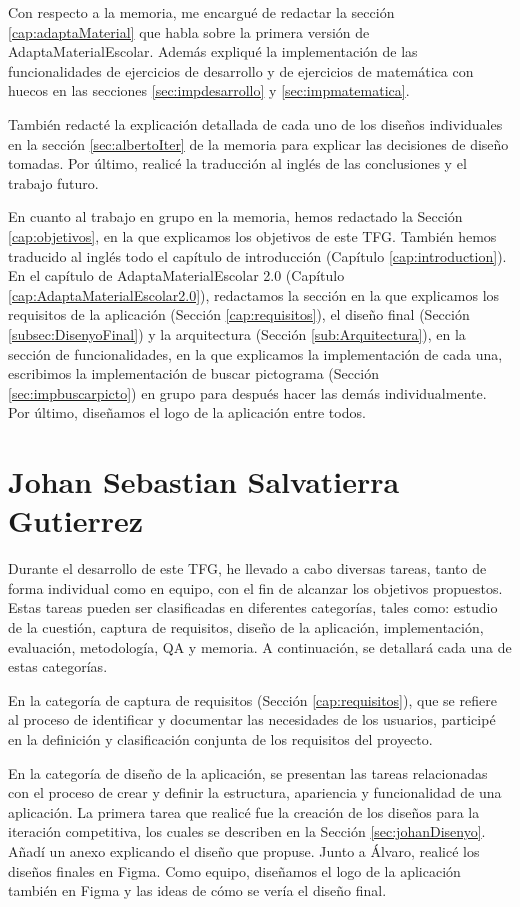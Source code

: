 Con respecto a la memoria, me encargué de redactar la sección \ref{cap:adaptaMaterial} que habla sobre la primera versión de AdaptaMaterialEscolar. Además expliqué la implementación de las funcionalidades de ejercicios de desarrollo y de ejercicios de matemática con huecos en las secciones \ref{sec:impdesarrollo} y \ref{sec:impmatematica}.

También redacté la explicación detallada de cada uno de los diseños individuales en la sección \ref{sec:albertoIter} de la memoria para explicar las decisiones de diseño tomadas. Por último, realicé la traducción al inglés de las conclusiones y el trabajo futuro.

En cuanto al trabajo en grupo en la memoria, hemos redactado la Sección \ref{cap:objetivos}, en la que explicamos los objetivos de este TFG. También hemos traducido al inglés todo el capítulo de introducción (Capítulo \ref{cap:introduction}). En el capítulo de AdaptaMaterialEscolar 2.0 (Capítulo \ref{cap:AdaptaMaterialEscolar2.0}), redactamos la sección en la que explicamos los requisitos de la aplicación (Sección \ref{cap:requisitos}), el diseño final (Sección \ref{subsec:DisenyoFinal}) y la arquitectura (Sección \ref{sub:Arquitectura}), en la sección de funcionalidades, en la que explicamos la implementación de cada una, escribimos la implementación de buscar pictograma (Sección \ref{sec:impbuscarpicto}) en grupo para después hacer las demás individualmente. Por último, diseñamos el logo de la aplicación entre todos.


\section{Johan Sebastian Salvatierra Gutierrez}
Durante el desarrollo de este TFG, he llevado a cabo diversas tareas, tanto de forma individual como en equipo, con el fin de alcanzar los objetivos propuestos. Estas tareas pueden ser clasificadas en diferentes categorías, tales como: estudio de la cuestión, captura de requisitos, diseño de la aplicación, implementación, evaluación, metodología, QA y memoria. A continuación, se detallará cada una de estas categorías.

En la categoría de captura de requisitos (Sección \ref{cap:requisitos}), que se refiere al proceso de identificar y documentar las necesidades de los usuarios, participé en la definición y clasificación conjunta de los requisitos del proyecto.

En la categoría de diseño de la aplicación, se presentan las tareas relacionadas con el proceso de crear y definir la estructura, apariencia y funcionalidad de una aplicación. La primera tarea que realicé fue la creación de los diseños para la iteración competitiva, los cuales se describen en la Sección \ref{sec:johanDisenyo}. Añadí un anexo explicando el diseño que propuse. Junto a Álvaro, realicé los diseños finales en Figma. Como equipo, diseñamos el logo de la aplicación también en Figma y las ideas de cómo se vería el diseño final.

